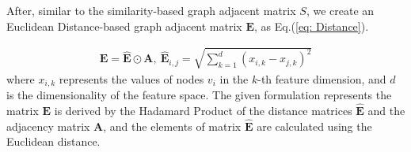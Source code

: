 \documentclass{article}
\begin{document}
After, similar to the similarity-based graph adjacent matrix $S$, we create an Euclidean Distance-based graph adjacent matrix $\mathbf{E}$,  as Eq.(\ref{eq: Distance}).

\begin{equation}
\begin{aligned}
\mathbf{E}=\widehat{\mathbf{E}} \odot \mathbf{A}, ~\widehat{\mathbf{E}}_{i,j} = \sqrt{\sum_{k=1}^{d} (x_{i,k} - x_{j,k})^2}
\label{eq: Distance}
\end{aligned}
\end{equation}
where $x_{i,k}$ represents the values of nodes $v_i$ in the $k$-th feature dimension, and $d$ is the dimensionality of the feature space. 
The given formulation represents the matrix $\mathbf{E}$ is derived by the Hadamard Product of the distance matrices $\widehat{\mathbf{E}}$ and the adjacency matrix $\mathbf{A}$, and the elements of matrix $\widehat{\mathbf{E}}$ are calculated using the Euclidean distance. 
\end{document}
